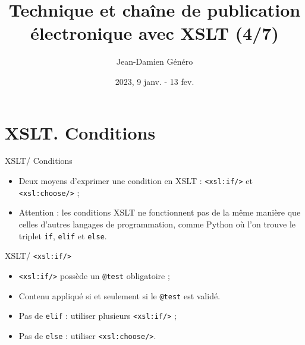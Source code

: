 \documentclass{beamer}
\title{Technique et chaîne de publication électronique avec XSLT (4/7)}
\date{2023, 9 janv. - 13 fev.}
\author{Jean-Damien Généro}
\institute{École nationale des chartes -- M2 TNAH}
\begin{document}
    \maketitle
    
    \section{XSLT. Conditions}

    \begin{frame}{XSLT/ Conditions}
        \Large
        \begin{itemize}
            \item Deux moyens d'exprimer une condition en XSLT : \texttt{<xsl:if/>} et \texttt{<xsl:choose/>} ;
            \bigskip
            \item Attention : les conditions XSLT ne fonctionnent pas de la même manière que celles d'autres langages de programmation, comme Python où l'on trouve le triplet \texttt{if}, \texttt{elif} et \texttt{else}.
        \end{itemize}
    \end{frame}

    \begin{frame}{XSLT/ \texttt{<xsl:if/>}}
        \Large
        \begin{itemize}
            \item \texttt{<xsl:if/>} possède un \texttt{@test} obligatoire ;
            \item Contenu appliqué si et seulement si le \texttt{@test} est validé.
            \bigskip
            \item Pas de \texttt{elif} : utiliser plusieurs \texttt{<xsl:if/>} ;
            \item Pas de \texttt{else} : utiliser \texttt{<xsl:choose/>}.
        \end{itemize}
    \end{frame}
    
\end{document}
